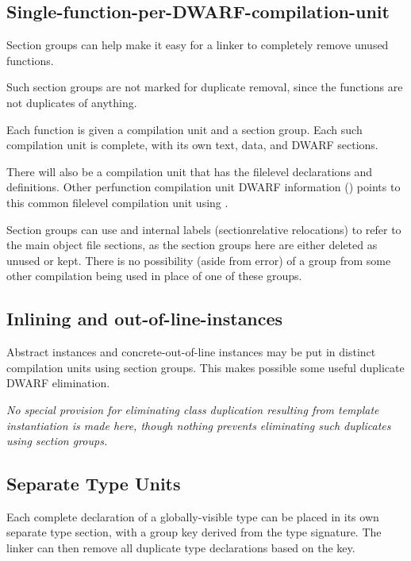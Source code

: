 \subsection{Single-function-per-DWARF-compilation-unit}
\label{app:singlefunctionperdwarfcompilationunit}

Section groups can help make it easy for a linker to completely
remove unused functions.

Such 
section groups are not marked for duplicate removal,
since the functions are not duplicates of anything.

Each function is given a compilation unit and a section
group. Each such compilation unit is complete, with its own
text, data, and DWARF sections.

There will also be a compilation unit that has the file\dash level
declarations and definitions. Other per\dash function compilation
unit DWARF information (\dotdebuginfo{}) points to this common
file\dash level compilation unit using 
\DWTAGimportedunit.

Section groups can use \DWFORMrefaddr{} and internal labels
(section\dash relative relocations) to refer to the main object
file sections, as the 
section groups here are either deleted
as unused or kept. There is no possibility (aside from error)
of a group from some other compilation being used in place
of one of these groups.


\subsection{Inlining and out-of-line-instances}
\label{app:inliningandoutoflineinstances}

Abstract instances
and concrete-out-of-line instances may be
put in distinct compilation units using 
section groups. 
This
makes possible some useful duplicate DWARF elimination.

\textit{No special provision for eliminating class duplication
resulting from template instantiation is made here, though
nothing prevents eliminating such duplicates using section
groups.}


\subsection{Separate Type Units}
\label{app:separatetypeunits}

Each complete declaration of a globally-visible type can be
placed in its own separate type section, with a group key
derived from the type signature. The linker can then remove
all duplicate type declarations based on the key.

